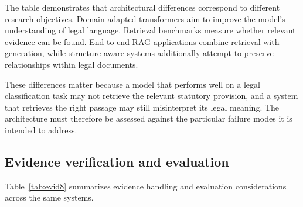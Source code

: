 The table demonstrates that architectural differences correspond to different research objectives.
Domain-adapted transformers aim to improve the model's understanding of legal language. Retrieval
benchmarks measure whether relevant evidence can be found. End-to-end RAG applications combine
retrieval with generation, while structure-aware systems additionally attempt to preserve
relationships within legal documents.

These differences matter because a model that performs well on a legal classification task may not
retrieve the relevant statutory provision, and a system that retrieves the right passage may still
misinterpret its legal meaning. The architecture must therefore be assessed against the particular
failure modes it is intended to address.

\subsection{Evidence verification and evaluation}

Table~\ref{tab:evid8} summarizes evidence handling and evaluation considerations across the same
systems.

